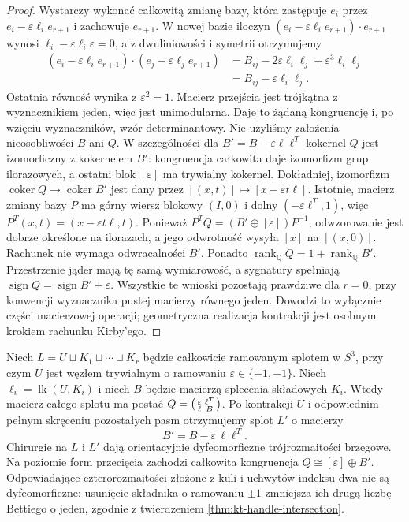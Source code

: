 \begin{proof}
Wystarczy wykonać całkowitą zmianę bazy, która zastępuje
$e_i$ przez $e_i-\varepsilon\ell_i e_{r+1}$ i zachowuje
$e_{r+1}$. W nowej bazie iloczyn
$(e_i-\varepsilon\ell_i e_{r+1})\cdot e_{r+1}$
wynosi $\ell_i-\varepsilon\ell_i\varepsilon=0$,
a z dwuliniowości i symetrii otrzymujemy
\[
\begin{aligned}
(e_i-\varepsilon\ell_i e_{r+1})\cdot
(e_j-\varepsilon\ell_j e_{r+1})
&=B_{ij}-2\varepsilon\ell_i\ell_j
+\varepsilon^3\ell_i\ell_j\\
&=B_{ij}-\varepsilon\ell_i\ell_j.
\end{aligned}
\]
Ostatnia równość wynika z $\varepsilon^2=1$.
Macierz przejścia jest trójkątna z wyznacznikiem jeden,
więc jest unimodularna. Daje to żądaną kongruencję
i, po wzięciu wyznaczników, wzór determinantowy.
Nie użyliśmy założenia nieosobliwości $B$ ani $Q$.
W szczególności dla $B'=B-\varepsilon\ell\ell^T$
kokernel $Q$ jest izomorficzny z kokernelem $B'$:
kongruencja całkowita daje izomorfizm grup
ilorazowych, a ostatni blok $[\varepsilon]$
ma trywialny kokernel. Dokładniej, izomorfizm
$\operatorname{coker}Q\to\operatorname{coker}B'$
jest dany przez
$[(x,t)]\mapsto[x-\varepsilon t\ell]$.
Istotnie, macierz zmiany bazy $P$ ma górny
wiersz blokowy $(I,0)$ i dolny
$(-\varepsilon\ell^T,1)$, więc
$P^T(x,t)=(x-\varepsilon t\ell,t)$.
Ponieważ $P^TQ=(B'\oplus[\varepsilon])P^{-1}$,
odwzorowanie jest dobrze określone na ilorazach,
a jego odwrotność wysyła $[x]$ na $[(x,0)]$.
Rachunek nie wymaga odwracalności $B'$. Ponadto
$\operatorname{rank}_{\mathbb Q}Q=
1+\operatorname{rank}_{\mathbb Q}B'$.
Przestrzenie jąder mają tę samą wymiarowość,
a sygnatury spełniają
$\operatorname{sign}Q=\operatorname{sign}B'+\varepsilon$.
Wszystkie te wnioski pozostają prawdziwe
dla $r=0$, przy konwencji wyznacznika pustej
macierzy równego jeden.
Dowodzi to wyłącznie części macierzowej operacji;
geometryczna realizacja kontrakcji jest osobnym krokiem
rachunku Kirby'ego.
\end{proof}

\begin{twierdzenie}
\label{thm:tg-kirby-blowdown}
Niech $L=U\sqcup K_1\sqcup\cdots\sqcup K_r$
będzie całkowicie ramowanym splotem w $S^3$,
przy czym $U$ jest węzłem trywialnym o ramowaniu
$\varepsilon\in\{+1,-1\}$.
Niech $\ell_i=\operatorname{lk}(U,K_i)$ i niech
$B$ będzie macierzą splecenia składowych $K_i$.
Wtedy macierz całego splotu ma postać
$Q=\begin{psmallmatrix}\varepsilon&\ell^T\\\ell&B\end{psmallmatrix}$.
Po kontrakcji $U$ i odpowiednim pełnym skręceniu
pozostałych pasm otrzymujemy splot $L'$ o macierzy
\[
B'=B-\varepsilon\,\ell\ell^T.
\]
Chirurgie na $L$ i $L'$ dają orientacyjnie dyfeomorficzne
trójrozmaitości brzegowe. Na poziomie form przecięcia
zachodzi całkowita kongruencja
$Q\cong[\varepsilon]\oplus B'$.
Odpowiadające czterorozmaitości złożone z kuli
i uchwytów indeksu dwa nie są dyfeomorficzne:
usunięcie składnika o ramowaniu $\pm1$
zmniejsza ich drugą liczbę Bettiego o jeden,
zgodnie z twierdzeniem
\ref{thm:kt-handle-intersection}.
\end{twierdzenie}

